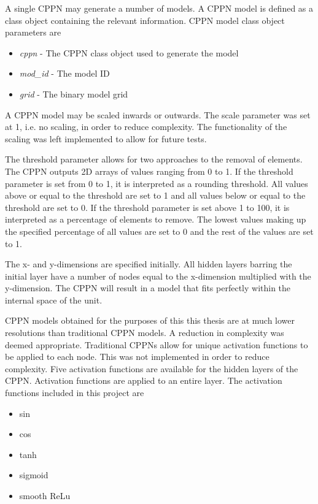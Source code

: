 A single CPPN may generate a number of models. A CPPN model is defined as a class object containing the relevant information. CPPN model class object parameters are

\begin{itemize}
	\item \textit{cppn} - The CPPN class object used to generate the model
	\item \textit{mod\_id} - The model ID
	\item \textit{grid} - The binary model grid
\end{itemize}

A CPPN model may be scaled inwards or outwards. The scale parameter was set at 1, i.e. no scaling, in order to reduce complexity. The functionality of the scaling was left implemented to allow for future tests.

The threshold parameter allows for two approaches to the removal of elements. The CPPN outputs 2D arrays of values ranging from 0 to 1. If the threshold parameter is set from 0 to 1, it is interpreted as a rounding threshold. All values above or equal to the threshold are set to 1 and all values below or equal to the threshold are set to 0. If the threshold parameter is set above 1 to 100, it is interpreted as a percentage of elements to remove. The lowest values making up the specified percentage of all values are set to 0 and the rest of the values are set to 1.

The x- and y-dimensions are specified initially. All hidden layers barring the initial layer have a number of nodes equal to the x-dimension multiplied with the y-dimension. The CPPN will result in a model that fits perfectly within the internal space of the unit.

CPPN models obtained for the purposes of this this thesis are at much lower resolutions than traditional CPPN models. A reduction in complexity was deemed appropriate. Traditional CPPNs allow for unique activation functions to be applied to each node. This was not implemented in order to reduce complexity. Five activation functions are available for the hidden layers of the CPPN. Activation functions are applied to an entire layer. The activation functions included in this project are

\begin{itemize}
	\item sin
	\item cos
	\item tanh
	\item sigmoid
	\item smooth ReLu
\end{itemize}

